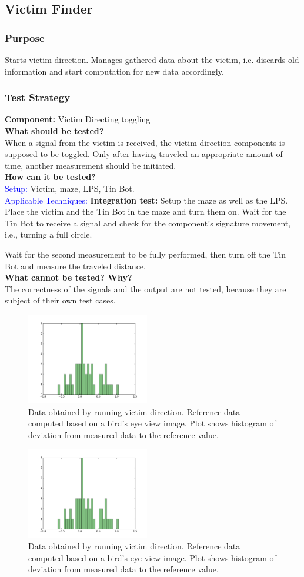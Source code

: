 \documentclass[a4paper,parskip,headheight=38pt]{scrartcl} %
\newcommand{\teststrat}[5]{
    \subsubsection{Test Strategy}
	\textbf{Component:} #1 \\
	\noindent\textbf{What should be tested?} \\
    \noindent #2 \\
	\noindent\textbf{How can it be tested?} \\
    \noindent\textcolor{blue}{Setup:} #3 \\
    \noindent\textcolor{blue}{Applicable Techniques:} #4 \\
	\noindent\textbf{What cannot be tested? Why?} \\
    \noindent #5
}
\newcommand{\ie}{i.e.}
\newcommand{\BLACK}{\textbf{Integration test: }}
\begin{document}
\subsection{Victim Finder}
\subsubsection{Purpose}
Starts victim direction. Manages gathered data about the victim, i.e. discards
old information and start computation for new data accordingly.

\teststrat{Victim Directing toggling}{
    When a signal from the victim is received, the victim direction components
    is supposed to be toggled. Only after having traveled an appropriate amount
    of time, another measurement should be initiated.
}{
    Victim, maze, LPS, Tin Bot.
}{
    \BLACK Setup the maze as well as the LPS. Place the victim and the
    Tin Bot in the
    maze and turn them on. Wait for the Tin Bot to receive a signal and check
    for the component's signature movement, \ie, turning a full circle.

    Wait for the second measurement to be fully performed, then turn off the Tin
    Bot and measure the traveled distance.
}{
    The correctness of the signals and the output are not tested, because they
    are subject of their own test cases.
}

\begin{figure}[t]
\includegraphics[width=\textwidth, height=4cm]{victimdirectionbadplot.pdf}
\caption{Data obtained by running victim direction. Reference data computed
based on a bird's eye view image. Plot shows histogram of deviation from
measured data to the reference value.}
\label{fig:vddatabad}
\end{figure}
\begin{figure}[t]
\includegraphics[width=\textwidth, height=4cm]{victimdirectionbadplot.pdf}
\caption{Data obtained by running victim direction. Reference data computed
based on a bird's eye view image. Plot shows histogram of deviation from
measured data to the reference value.}
\label{fig:vddatagood}
\end{figure}
\end{document}
